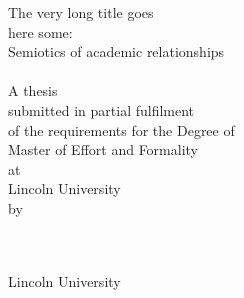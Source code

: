 
\hypertarget{TitlePage}{}


\begin{spacing}{1}
\begin{titlepage}
\begin{center}
\vspace*{9pt}
{\Medium\huge The very long title goes\\\smallskip here some:\\\bigskip Semiotics of academic relationships\\[1.7cm] }
 \\[1.1cm]
{\LARGE A thesis \\\smallskip submitted in partial fulfilment\\\smallskip of the requirements for the Degree of\\}
\medskip
{\LARGE Master of Effort and Formality\\
\vspace{37pt}
at\\
\vspace{17pt}
Lincoln University\\
\vspace{17pt}
by\\
\vspace{37pt}
\LARGE\namen\\[1.1cm]}

 \\[1.7cm]

{\Medium\LARGE Lincoln University\\}
\vfill

\end{center}
\end{titlepage}
\end{spacing}



\begin{spacing}{1}
\section*{\vspace{-33pt}\normalfont\Large{}}
\end{spacing}
{}

